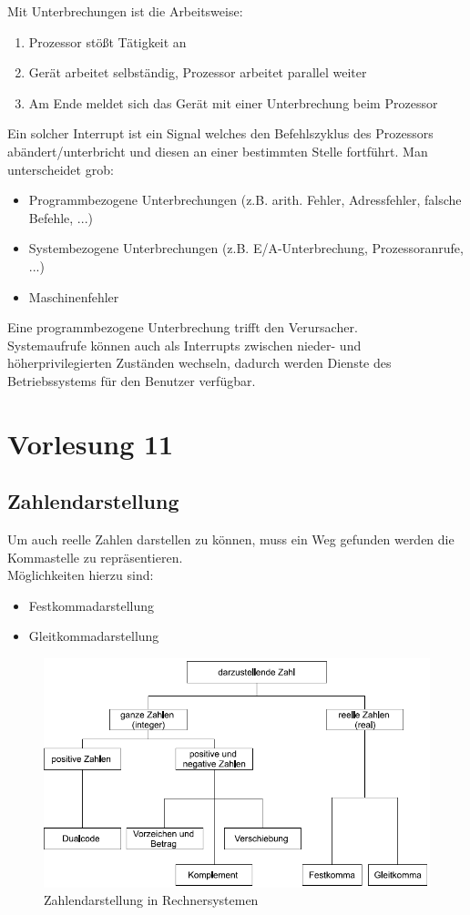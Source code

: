 \documentclass[a4paper,12pt,leqno]{article}
\begin{document}
Mit Unterbrechungen ist die Arbeitsweise:
\begin{enumerate}
\item Prozessor stößt Tätigkeit an
\item Gerät arbeitet selbständig, Prozessor arbeitet parallel weiter
\item Am Ende meldet sich das Gerät mit einer Unterbrechung beim Prozessor
\end{enumerate}

Ein solcher Interrupt ist ein Signal welches den Befehlszyklus des Prozessors abändert/unterbricht und diesen an einer bestimmten Stelle fortführt. Man unterscheidet grob:
\begin{itemize}
\item Programmbezogene Unterbrechungen (z.B. arith. Fehler, Adressfehler, falsche Befehle, ...)
\item Systembezogene Unterbrechungen (z.B. E/A-Unterbrechung, Prozessoranrufe, ...)
\item Maschinenfehler
\end{itemize}

Eine programmbezogene Unterbrechung trifft den Verursacher.\\
Systemaufrufe können auch als Interrupts zwischen nieder- und höherprivilegierten Zuständen wechseln, dadurch werden Dienste des Betriebssystems für den Benutzer verfügbar.

\section{Vorlesung 11}
\subsection{Zahlendarstellung}
Um auch reelle Zahlen darstellen zu können, muss ein Weg gefunden werden die Kommastelle zu repräsentieren.\\
Möglichkeiten hierzu sind:
\begin{itemize}
\item Festkommadarstellung
\item Gleitkommadarstellung
\end{itemize} 

\begin{figure}[h!]
\centering
\includegraphics[scale=0.6]{Grafiken/Zahlendarstellung.png}
\caption{Zahlendarstellung in Rechnersystemen}
\end{figure}
\end{document}
